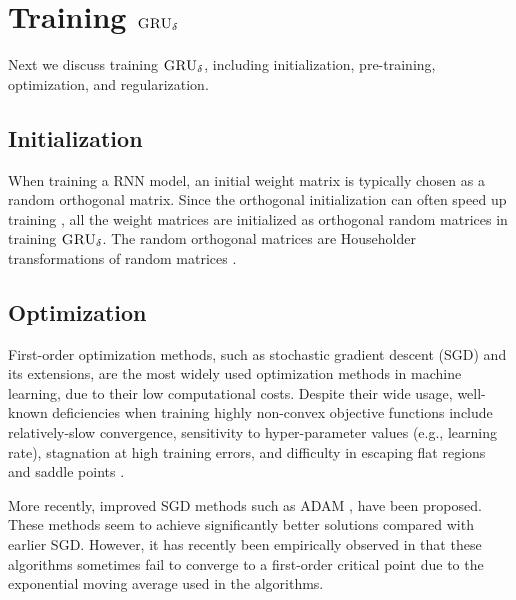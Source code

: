 \documentclass[letterpaper,12pt,titlepage,oneside,final]{book}
\numberwithin{equation}{section}
\theoremstyle{definition}
\newcommand{\model}{\textsc{GRU}_\delta}
\begin{document}
\section{Training $\model$} \label{sec:train}
Next we discuss training  $\model$,  including initialization,  pre-training,  optimization, and regularization.
\subsection{Initialization}\label{sec:init}
When training a RNN model,  an initial weight matrix is typically chosen as a random orthogonal matrix. Since the orthogonal initialization  can often speed up training \citep{le2015simple}, all the weight matrices   are initialized as orthogonal random matrices in training $\model$. The random orthogonal matrices are   Householder transformations of random matrices \citep{le2015simple}.

\subsection{Optimization}
First-order optimization methods, such as stochastic gradient descent (SGD) and its extensions,  are the most widely used optimization methods in machine learning, due to  their low computational costs. Despite their wide usage,  well-known deficiencies when  training highly non-convex objective functions include relatively-slow convergence, sensitivity to hyper-parameter values (e.g., learning rate), stagnation at high training errors, and difficulty in escaping flat regions and saddle points \citep{yao2018inexact}.

More recently,  improved SGD methods such as ADAM \citep{kingma2014adam}, have been proposed.
These methods seem to achieve significantly better solutions compared with earlier SGD. However,  it has recently been empirically observed in \cite{reddi2019convergence}  that these algorithms sometimes fail to converge to a first-order critical point due to the exponential moving average used in the algorithms.
\end{document}
